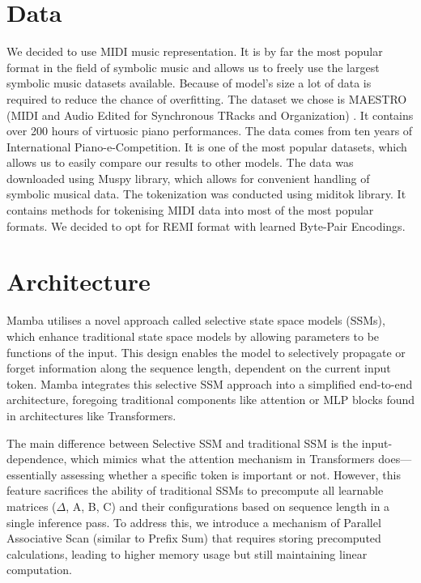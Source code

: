 \documentclass[conference,compsoc]{IEEEtran}
\begin{document}




\section{Data}
We decided to use MIDI \cite{midi} music representation. It is by far the most popular format in the field of symbolic music and allows us to freely use the largest symbolic music datasets available. Because of model's size a lot of data is required to reduce the chance of overfitting. The dataset we chose is MAESTRO (MIDI and Audio Edited for Synchronous TRacks and Organization) \cite{maestro1} \cite{maestro2} . It contains over 200 hours of virtuosic piano performances. The data comes from ten years of International Piano-e-Competition. It is one of the most popular datasets, which allows us to easily compare our results to other models. The data was downloaded using Muspy \cite{muspy} library, which allows for convenient handling of symbolic musical data. The tokenization was conducted using miditok \cite{miditok2021} library. It contains methods for tokenising MIDI data into most of the most popular formats. We decided to opt for REMI \cite{remi} format with learned Byte-Pair Encodings.

\section{Architecture}
Mamba utilises a novel approach called selective state space models (SSMs), which enhance traditional state space models by allowing
parameters to be functions of the input. This design enables the model to selectively propagate or forget information along the sequence length,
dependent on the current input token. Mamba integrates this selective SSM approach into a simplified end-to-end architecture, foregoing traditional components
like attention or MLP blocks found in architectures like Transformers.

The main difference between Selective SSM and traditional SSM is the input-dependence, which mimics what the attention mechanism in Transformers
does—essentially assessing whether a specific token is important or not. However, this feature sacrifices the ability of traditional SSMs
to precompute all learnable matrices ($\Delta$, A, B, C) and their configurations based on sequence length in a single inference pass.
To address this, we introduce a mechanism of Parallel Associative Scan (similar to Prefix Sum) that requires storing precomputed calculations,
leading to higher memory usage but still maintaining linear computation.
\end{document}
